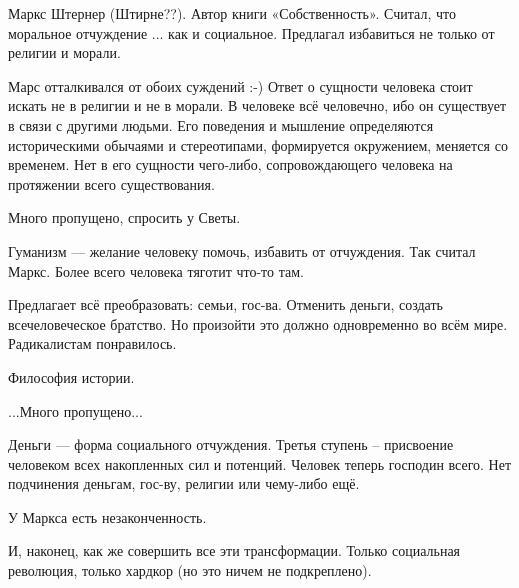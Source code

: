 Маркс Штернер (Штирне??). Автор книги «Собственность». Считал, что моральное отчуждение ... как и социальное.  Предлагал избавиться не только от религии и морали.

Марс отталкивался от обоих суждений :-)
Ответ о сущности человека стоит искать не в религии и не в морали. В человеке всё человечно, ибо он существует в связи с другими людьми. Его поведения и мышление определяются историческими обычаями и стереотипами, формируется окружением, меняется со временем.
Нет в его сущности чего-либо, сопровождающего человека на протяжении всего существования.

Много пропущено, спросить у Светы.

Гуманизм --- желание человеку помочь, избавить от отчуждения. Так считал Маркс.
Более всего человека тяготит что-то там.

Предлагает всё преобразовать: семьи, гос-ва. Отменить деньги, создать всечеловеческое братство. Но произойти это должно одновременно во всём мире. Радикалистам понравилось.

Философия истории.

...Много пропущено...

Деньги --- форма социального отчуждения.
Третья ступень -- присвоение человеком всех накопленных сил и потенций. Человек теперь господин всего. Нет подчинения деньгам, гос-ву, религии или чему-либо ещё.

У Маркса есть незаконченность. 

И, наконец, как же совершить все эти трансформации. Только социальная революция, только хардкор (но это ничем не подкреплено).